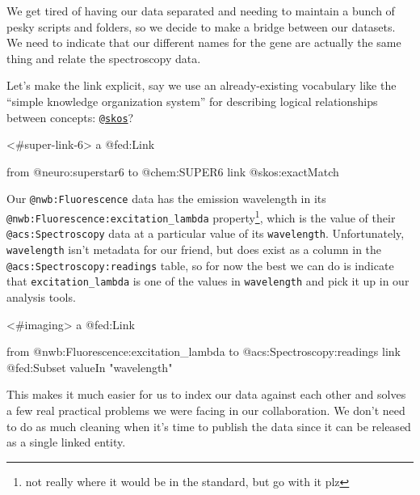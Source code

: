 \documentclass[10pt]{article}
\newenvironment{Shaded}{}{}
\newcommand{\NormalTok}[1]{#1}
\begin{document}
\begin{multicols}{2}
We get tired of having our data separated and needing to maintain a
bunch of pesky scripts and folders, so we decide to make a bridge
between our datasets. We need to indicate that our different names for
the gene are actually the same thing and relate the spectroscopy data.

Let's make the link explicit, say we use an already-existing vocabulary
like the ``simple knowledge organization system'' for describing logical
relationships between concepts:
\href{https://www.w3.org/2009/08/skos-reference/skos.html}{\texttt{@skos}}?

\begin{Shaded}
\begin{Highlighting}[]
\NormalTok{\textless{}\#super{-}link{-}6\textgreater{}}
\NormalTok{  a @fed:Link}
  
\NormalTok{  from @neuro:superstar6}
\NormalTok{  to @chem:SUPER6}
\NormalTok{  link @skos:exactMatch}
\end{Highlighting}
\end{Shaded}

Our \texttt{@nwb:Fluorescence} data has the emission wavelength in its
\texttt{@nwb:Fluorescence:excitation\_lambda} property\footnote{not
  really where it would be in the standard, but go with it plz}, which
is the value of their \texttt{@acs:Spectroscopy} data at a particular
value of its \texttt{wavelength}. Unfortunately, \texttt{wavelength}
isn't metadata for our friend, but does exist as a column in the
\texttt{@acs:Spectroscopy:readings} table, so for now the best we can do
is indicate that \texttt{excitation\_lambda} is one of the values in
\texttt{wavelength} and pick it up in our analysis tools.

\begin{Shaded}
\begin{Highlighting}[]
\NormalTok{\textless{}\#imaging\textgreater{}}
\NormalTok{ a @fed:Link}
 
\NormalTok{ from @nwb:Fluorescence:excitation\_lambda}
\NormalTok{ to @acs:Spectroscopy:readings}
\NormalTok{ link @fed:Subset}
\NormalTok{   valueIn "wavelength"}
\end{Highlighting}
\end{Shaded}

This makes it much easier for us to index our data against each other
and solves a few real practical problems we were facing in our
collaboration. We don't need to do as much cleaning when it's time to
publish the data since it can be released as a single linked entity.


\end{multicols}
\end{document}
